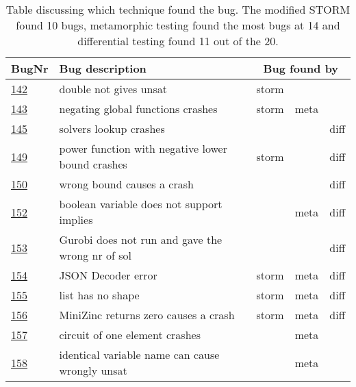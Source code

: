 \begin{table}[]
	\centering
	\caption{Table discussing which technique found the bug. The modified STORM found 10 bugs, metamorphic testing found the most bugs at 14 and differential testing found 11 out of the 20.}
	\label{tab:bug:Technique}
	\begin{tabular}{lllll}
		\hline
		BugNr & Bug description                                           & \multicolumn{3}{c}{\centering  Bug found by} \\ \toprule
		\href{https://github.com/CPMpy/cpmpy/issues/142}{142} & double not gives unsat                            & storm &       &      \\
		\href{https://github.com/CPMpy/cpmpy/issues/143}{143} & negating global functions crashes                 & storm & meta  &      \\
		\href{https://github.com/CPMpy/cpmpy/issues/145}{145} & solvers lookup crashes                            &       &       & diff \\
		\href{https://github.com/CPMpy/cpmpy/issues/149}{149} & power function with negative lower bound crashes  & storm &       & diff \\
		\href{https://github.com/CPMpy/cpmpy/issues/150}{150} & wrong bound causes a crash                  &       &       & diff \\
		\href{https://github.com/CPMpy/cpmpy/issues/152}{152} & boolean variable does not support implies         &       & meta  & diff \\
		\href{https://github.com/CPMpy/cpmpy/issues/153}{153} & Gurobi does not run and gave the wrong nr of sol  &       &       & diff \\
		\href{https://github.com/CPMpy/cpmpy/issues/154}{154} & JSON Decoder error                                & storm & meta  & diff \\
		\href{https://github.com/CPMpy/cpmpy/issues/155}{155} & list has no shape                                 & storm & meta  & diff \\
		\href{https://github.com/CPMpy/cpmpy/issues/156}{156} & MiniZinc returns zero causes a crash              & storm & meta  & diff \\
		\href{https://github.com/CPMpy/cpmpy/issues/157}{157} & circuit of one element crashes                    &       & meta  &      \\
		\href{https://github.com/CPMpy/cpmpy/issues/158}{158} & identical variable name can cause wrongly unsat   &       & meta  &      \\

\end{tabular}
\end{table}
